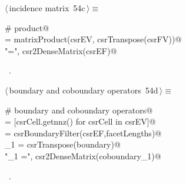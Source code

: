 \documentclass[11pt,oneside]{article}    %
\begin{document}
\begin{flushleft} \small \label{scrap89}
\protect{}$\langle\,$incidence matrix\nobreak\ {\footnotesize 54c}$\,\rangle\equiv$
\vspace{-1ex}
\begin{list}{}{} \item
\mbox{}\verb@# product@\\
\mbox{}\verb@csrEF = matrixProduct(csrEV, csrTranspose(csrFV))@\\
\mbox{}\verb@print "\nEF =\n", csr2DenseMatrix(csrEF)@\\
\mbox{}\verb@@{\NWsep}
\end{list}
\vspace{-1ex}
\footnotesize\addtolength{\baselineskip}{-1ex}
\begin{list}{}{\setlength{\itemsep}{-\parsep}\setlength{\itemindent}{-\leftmargin}}
\item \NWtxtMacroRefIn\ .
\end{list}
\end{flushleft}

\begin{flushleft} \small \label{scrap90}
\protect{}$\langle\,$boundary and coboundary operators\nobreak\ {\footnotesize 54d}$\,\rangle\equiv$
\vspace{-1ex}
\begin{list}{}{} \item
\mbox{}\verb@# boundary and coboundary operators@\\
\mbox{}\verb@facetLengths = [csrCell.getnnz() for csrCell in csrEV]@\\
\mbox{}\verb@boundary = csrBoundaryFilter(csrEF,facetLengths)@\\
\mbox{}\verb@coboundary_1 = csrTranspose(boundary)@\\
\mbox{}\verb@print "\ncoboundary_1 =\n", csr2DenseMatrix(coboundary_1)@\\
\mbox{}\verb@@{\NWsep}
\end{list}
\vspace{-1ex}
\footnotesize\addtolength{\baselineskip}{-1ex}
\begin{list}{}{\setlength{\itemsep}{-\parsep}\setlength{\itemindent}{-\leftmargin}}
\item \NWtxtMacroRefIn\ .
\end{list}
\end{flushleft}
\end{document}
